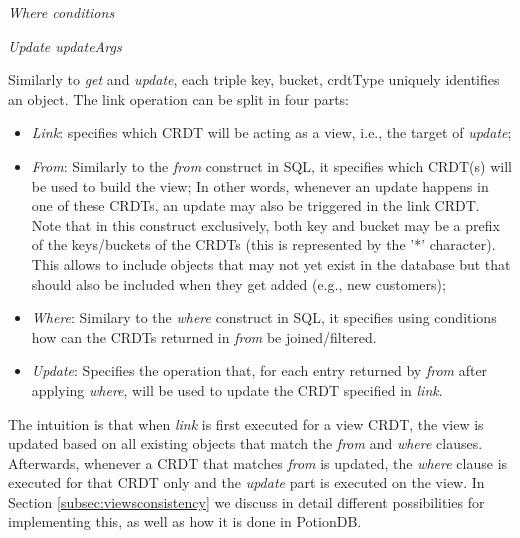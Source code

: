 \documentclass{vldb}
\newcommand{\emphvspace}{0.5\baselineskip}
\newcommand{\middleblockemph}[1]{\hspace{2em}\emph{#1}}
\newcommand{\lastblockemph}[1]{\hspace{2em}\emph{#1}\vspace{\emphvspace}}
\begin{document}
\middleblockemph{Where conditions}

\lastblockemph{Update updateArgs}

Similarly to \emph{get} and \emph{update}, each triple key, bucket, crdtType uniquely identifies an object.
The link operation can be split in four parts:

\begin{itemize}
	\item \emph{Link}: specifies which CRDT will be acting as a view, i.e., the target of  \emph{update};
	\item \emph{From}: Similarly to the \emph{from} construct in SQL, it specifies which CRDT(s) will be used to build the view;
	In other words, whenever an update happens in one of these CRDTs, an update may also be triggered in the link CRDT.
	Note that in this construct exclusively, both key and bucket may be a prefix of the keys/buckets of the CRDTs (this is represented by the '*' character).
	This allows to include objects that may not yet exist in the database but that should also be included when they get added (e.g., new customers);
	\item \emph{Where}: Similary to the \emph{where} construct in SQL, it specifies using conditions how can the CRDTs returned in \emph{from} be joined/filtered. %
	\item \emph{Update}: Specifies the operation that, for each entry returned by \emph{from} after applying \emph{where}, will be used to update the CRDT specified in \emph{link}.
\end{itemize}

The intuition is that when \emph{link} is first executed for a view CRDT, the view is updated based on all existing objects that match the \emph{from} and \emph{where} clauses.
Afterwards, whenever a CRDT that matches \emph{from} is updated, the \emph{where} clause is executed for that CRDT only and the \emph{update} part is executed on the view.
In Section \ref{subsec:viewsconsistency} we discuss in detail different possibilities for implementing this, as well as how it is done in PotionDB. %
\end{document}
